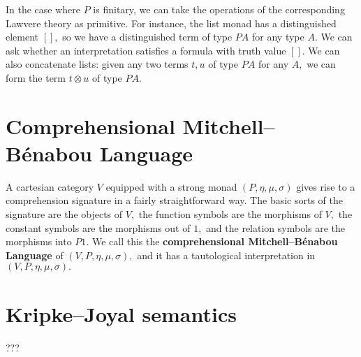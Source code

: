 \documentclass{article}
\begin{document}
In the case where $P$ is finitary, we can take the operations of the corresponding Lawvere theory as primitive.  For instance, the list monad has a distinguished element $[],$ so we have a distinguished term of type $PA$ for any type $A.$  We can ask whether an interpretation satisfies a formula with truth value $[].$  We can also concatenate lists: given any two terms $t, u$ of type $PA$ for any $A,$ we can form the term $t \otimes u$ of type $PA.$



\section{Comprehensional Mitchell--B\'enabou Language}

A cartesian category $V$ equipped with a strong monad $(P, \eta, \mu, \sigma)$ gives rise to a comprehension signature in a fairly straightforward way.  The basic sorts of the signature are the objects of $V,$ the function symbols are the morphisms of $V,$ the constant symbols are the morphisms out of $1,$ and the relation symbols are the morphisms into $P1.$  We call this the {\bf comprehensional Mitchell--B\'enabou Language} of $(V, P, \eta, \mu, \sigma),$ and it has a tautological interpretation in $(V, P, \eta, \mu, \sigma).$

\section{Kripke--Joyal semantics}

???
\end{document}
